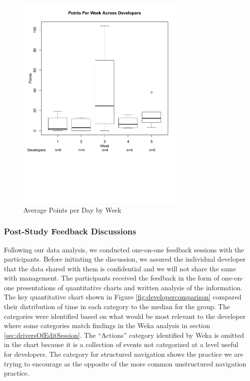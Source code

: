 \documentclass{sig-alternate}
\begin{document}
\begin{figure}
	\includegraphics[width=3.3in]{pointsbyweek_ann.pdf}
	\caption{Average Points per Day by Week}
	\label{fig:pointsbyweek}
\end{figure}

\subsubsection{Post-Study Feedback Discussions}

Following our data analysis, we conducted one-on-one feedback sessions with the participants. Before initiating the discussion, we assured the individual developer that the data shared with them is confidential and we will not share the same with management. The participants received the feedback in the form of one-on-one presentations of quantitative charts and written analysis of the information.  The key quantitative chart shown in Figure \ref{fig:developercomparison} compared their distribution of time in each category to the median for the group.   The categories were identified based on what would be most relevant to the developer where some categories match findings in the Weka analysis in section \ref{sec:driversOfEditSession}.   The ``Actions'' category identified by Weka is omitted in the chart because it is a collection of events not categorized at a level useful for developers.  The category for structured navigation shows the practice we are trying to encourage as the opposite of the more common unstructured navigation practice. 
\end{document}

